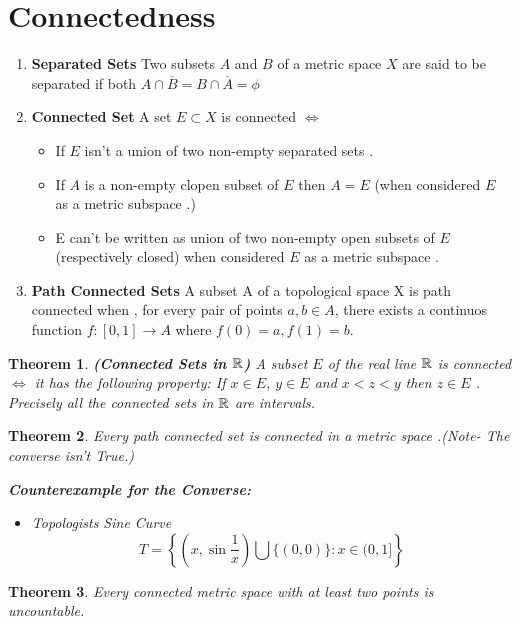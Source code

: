 \documentclass{article}
\newenvironment{simplebox}{\begin{tcolorbox}[colback=white,colframe=DarkBlue,sharp corners]\vspace{0.3cm}}{\vspace{0.3cm }
\end{tcolorbox}}
\newcommand{\set}[1]{\left\{#1\right\}}
\newtheorem{theorem}{Theorem}[section]
\begin{document}
\section{Connectedness}
\begin{enumerate}
	\item  \textbf{ Separated Sets } Two subsets $A$ and $B$ of a metric space $X$ are said to be separated if both $A\cap \overline{B} = B\cap \overline{A} = \phi$
	\item  \textbf{Connected Set} A set $E\subset X$ is connected $\iff$
	\begin{itemize}
		\item If $E$ isn't a union of two non-empty separated  sets .
		\item  If $A$ is a non-empty clopen subset of $E$ then $A=E$ (when considered $E$ as a metric subspace .)
		\item  E can't be written as union of two non-empty open subsets of $E$ (respectively closed) when considered $E$ as a metric subspace .  
	\end{itemize} 
\item \textbf{Path Connected Sets} A subset  A of a topological space X is path connected when , for every pair of points $a,b\in A$, there exists a continuos function $f:[0,1]\to A$ where $f(0)=a,f(1)=b$.
\end{enumerate}
\begin{theorem}
	\textbf{(Connected Sets in $\mathbb{R}$)} A subset $E$ of the real line $\mathbb{R}$ is connected $\iff$ it has the following property: If $x\in E$, $y\in E$ and $x<z<y$ then $z\in E$  .  Precisely all the connected sets in  $\mathbb{R}$ are intervals. 
\end{theorem}
\begin{theorem}
	Every path connected set is connected  in a metric space .(\textit{Note- The converse isn't True.})
	\begin{simplebox}
	\begin{center}
		\textbf{ Counterexample for the Converse:}
	\end{center}
	    \begin{itemize}
	    	\item  Topologists Sine Curve 
	    	\[T=\set{\left(x,\sin{\frac{1}{x}}\right)\bigcup\{(0,0)\}:x\in(0,1]}\]
	    \end{itemize}
	\end{simplebox}
\end{theorem}
\begin{theorem}
	Every connected metric space with at least two points is  uncountable.
\end{theorem}
\end{document}
